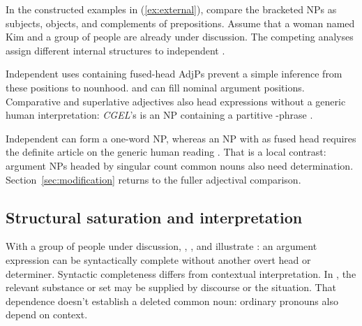 \documentclass[12pt]{article}
\begin{document}
In the constructed examples in (\ref{ex:external}), compare the bracketed NPs as subjects, objects, and complements of prepositions. Assume that a woman named Kim and a group of people are already under discussion. The competing analyses assign different internal structures to independent .

\begin{samepage}
\ea\label{ex:external}
\ea {}\qquad {}\qquad {}
\ex {}\qquad {}\qquad {}
\ex {}\qquad {}\qquad {}
\ex {}\qquad {}\qquad {}
\z\z
\end{samepage}

Independent uses containing fused-head AdjPs prevent a simple inference from these positions to nounhood.  and  can fill nominal argument positions. Comparative and superlative adjectives also head expressions without a generic human interpretation: \textit{CGEL}'s  is an NP containing a partitive -phrase \citep[332--333, 416--423]{huddleston2002}.

Independent  can form a one-word NP, whereas an NP with  as fused head requires the definite article  on the generic human reading \citep[417--418]{huddleston2002}. That is a local contrast: argument NPs headed by singular count common nouns also need determination. Section~\ref{sec:modification} returns to the fuller adjectival comparison.

\subsection{Structural saturation and interpretation}\label{sec:saturation}

With a group of people under discussion, , , and  illustrate : an argument expression can be syntactically complete without another overt head or determiner. Syntactic completeness differs from contextual interpretation. In , the relevant substance or set may be supplied by discourse or the situation. That dependence doesn't establish a deleted common noun: ordinary pronouns also depend on context.
\end{document}
